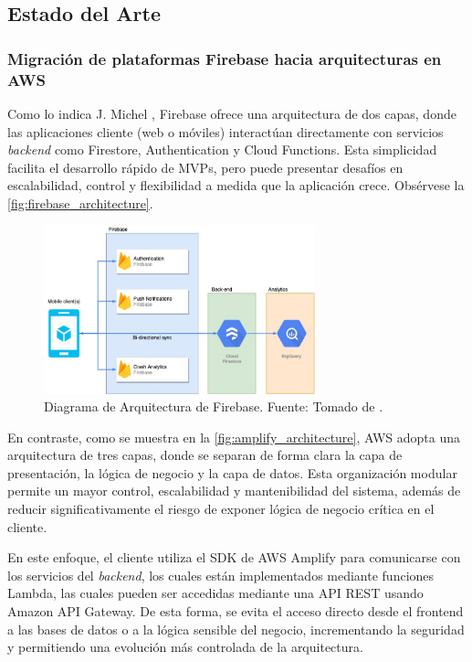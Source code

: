 \subsection{Estado del Arte}

\subsubsection{Migración de plataformas Firebase hacia arquitecturas en AWS}

Como lo indica J. Michel \cite{Michael2021}, Firebase ofrece una arquitectura de dos capas, donde las aplicaciones cliente (web o móviles) interactúan directamente con servicios \textit{backend} como Firestore, Authentication y Cloud Functions. Esta simplicidad facilita el desarrollo rápido de MVPs, pero puede presentar desafíos en escalabilidad, control y flexibilidad a medida que la aplicación crece. Obsérvese la \autoref{fig:firebase_architecture}.

\newcommand\firebaseArchitectureCaption{Diagrama de Arquitectura de Firebase. \hspace{1em}}

\begin{figure}[H]
  \centering
  \includegraphics[width=0.7\textwidth]{img/figures/fig3-firebase-architecture.png}
  \caption[\firebaseArchitectureCaption]{\firebaseArchitectureCaption Fuente: Tomado de \cite{Michael2021}.}
  \label{fig:firebase_architecture}
\end{figure}

En contraste, como se muestra en la \autoref{fig:amplify_architecture}, AWS adopta una arquitectura de tres capas, donde se separan de forma clara la capa de presentación, la lógica de negocio y la capa de datos. Esta organización modular permite un mayor control, escalabilidad y mantenibilidad del sistema, además de reducir significativamente el riesgo de exponer lógica de negocio crítica en el cliente.

En este enfoque, el cliente utiliza el SDK de AWS Amplify para comunicarse con los servicios del \textit{backend}, los cuales están implementados mediante funciones Lambda, las cuales pueden ser accedidas mediante una API REST usando Amazon API Gateway. De esta forma, se evita el acceso directo desde el frontend a las bases de datos o a la lógica sensible del negocio, incrementando la seguridad y permitiendo una evolución más controlada de la arquitectura.

